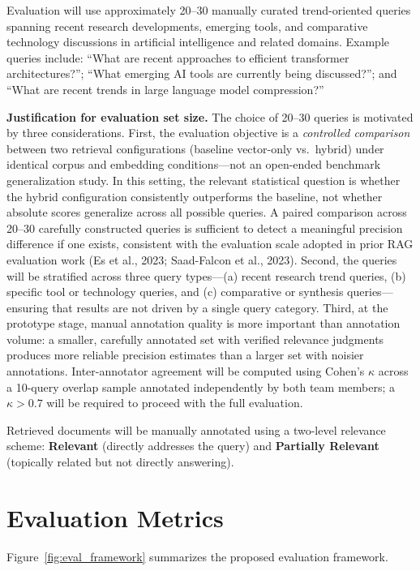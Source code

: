 \documentclass[12pt,a4paper]{report}
\begin{document}
Evaluation will use approximately 20--30 manually curated trend-oriented queries spanning recent research developments, emerging tools, and comparative technology discussions in artificial intelligence and related domains. Example queries include: ``What are recent approaches to efficient transformer architectures?''; ``What emerging AI tools are currently being discussed?''; and ``What are recent trends in large language model compression?''

\textbf{Justification for evaluation set size.} The choice of 20--30 queries is motivated by three considerations. First, the evaluation objective is a \emph{controlled comparison} between two retrieval configurations (baseline vector-only vs.\ hybrid) under identical corpus and embedding conditions—not an open-ended benchmark generalization study. In this setting, the relevant statistical question is whether the hybrid configuration consistently outperforms the baseline, not whether absolute scores generalize across all possible queries. A paired comparison across 20--30 carefully constructed queries is sufficient to detect a meaningful precision difference if one exists, consistent with the evaluation scale adopted in prior RAG evaluation work (Es et al., 2023; Saad-Falcon et al., 2023). Second, the queries will be stratified across three query types—(a) recent research trend queries, (b) specific tool or technology queries, and (c) comparative or synthesis queries—ensuring that results are not driven by a single query category. Third, at the prototype stage, manual annotation quality is more important than annotation volume: a smaller, carefully annotated set with verified relevance judgments produces more reliable precision estimates than a larger set with noisier annotations. Inter-annotator agreement will be computed using Cohen's $\kappa$ across a 10-query overlap sample annotated independently by both team members; a $\kappa > 0.7$ will be required to proceed with the full evaluation.

Retrieved documents will be manually annotated using a two-level relevance scheme: \textbf{Relevant} (directly addresses the query) and \textbf{Partially Relevant} (topically related but not directly answering).

\section{Evaluation Metrics}
\label{sec:eval_metrics}

Figure~\ref{fig:eval_framework} summarizes the proposed evaluation framework.
\end{document}
